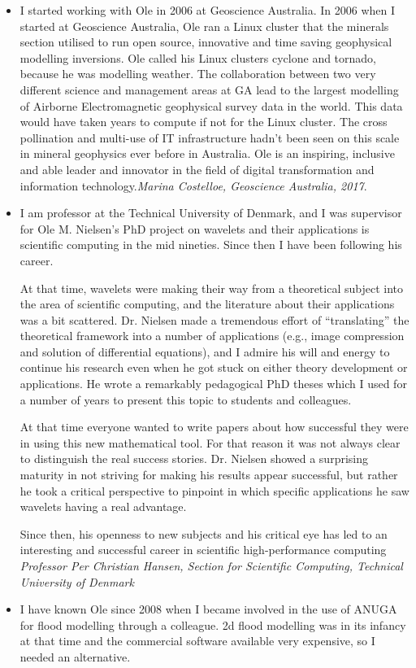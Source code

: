 \documentclass[11pt,a4paper]{article}
\begin{document}
\begin{itemize}
\item   I started working with Ole in 2006 at Geoscience Australia. In 2006 when I started at Geoscience Australia, Ole ran a Linux cluster that the minerals section utilised to run open source, innovative and time saving geophysical modelling inversions. Ole called his Linux clusters cyclone and tornado, because he was modelling weather. The collaboration between two very different science and management areas at GA lead to the largest modelling of Airborne Electromagnetic geophysical survey data in the world. This data would have taken years to compute if not for the Linux cluster. The cross pollination and multi-use of IT infrastructure hadn’t been seen on this scale in mineral geophysics ever before in Australia. Ole is an inspiring, inclusive and able leader and innovator in the field of digital transformation and information technology.\emph{Marina Costelloe, Geoscience Australia, 2017}. 
\item I am professor at the Technical University of Denmark, and I was supervisor for Ole M. Nielsen’s PhD project on wavelets and their applications is scientific computing in the mid nineties.  Since then I have been following his career.
 
At that time, wavelets were making their way from a theoretical subject into the area of scientific computing, and the literature about their applications was a bit scattered.  Dr. Nielsen made a tremendous effort of “translating” the theoretical framework into a number of applications (e.g., image compression and solution of differential equations), and I admire his will and energy to continue his research even when he got stuck on either theory development or applications.  He wrote a remarkably pedagogical PhD theses which I used for a number of years to present this topic to students and colleagues.
 
At that time everyone wanted to write papers about how successful they were in using this new mathematical tool.  For that reason it was not always clear to distinguish the real success stories.  Dr. Nielsen showed a surprising maturity in not striving for making his results appear successful, but rather he took a critical perspective to pinpoint in which specific applications he saw wavelets having a real advantage.
 
Since then, his openness to new subjects and his critical eye has led to an interesting and successful career in scientific high-performance computing
\emph{Professor Per Christian Hansen, Section for Scientific Computing, Technical University of Denmark}
\item
I have known Ole since 2008 when I became involved in the use of ANUGA for flood modelling through a colleague. 2d flood modelling was in its infancy at that time and the commercial software available very expensive, so I needed an alternative.


\end{itemize}
\end{document}

